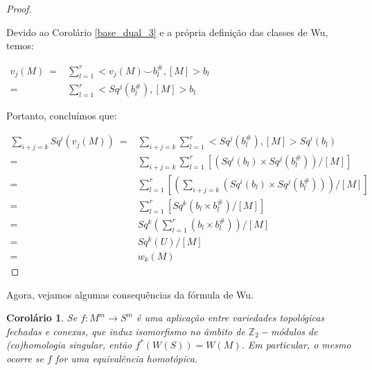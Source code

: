\documentclass[12pt,oneside]{book} %
\newtheorem{cor}    {\hspace{0.5cm}Corol\'ario}[chapter]
\newcommand{\ds}{\displaystyle}
\newcommand{\Z}{\mathbb{Z}}
\newcommand{\ccup}{\smile}
\begin{document}
\begin{proof}
	
	\
	
	\par Devido ao Corolário \ref{base_dual_3} e a própria definição das classes de Wu, temos: \newline 
	
	$ \begin{array}{rl}
		v_{j}(M) \ = & \ds\sum_{l=1}^{r}<v_{j}(M)\ccup b_{l}^{\#},[M]>b_{l} \\
		= & \ds\sum_{l=1}^{r}<Sq^{j}(b_{l}^{\#}),[M]>b_{l}
	\end{array} $ \newline
	
	\par Portanto, concluímos que: \newline
	
	$ \begin{array}{rl}
		\ds\sum_{i+j=k}Sq^{i}(v_{j}(M)) \ = & \ds\sum_{i+j=k}\ds\sum_{l=1}^{r}<Sq^{j}(b_{l}^{\#}),[M]>Sq^{i}(b_{l}) \\
		= & \ds\sum_{i+j=k}\ds\sum_{l=1}^{r} \left[ \left( Sq^{i}(b_{l})\times Sq^{j}(b_{l}^{\#}) \right) /[M] \right] \\
		= & \ds\sum_{l=1}^{r} \left[ \left( \ds\sum_{i+j=k} \left( Sq^{i}(b_{l})\times Sq^{j}(b_{l}^{\#}) \right) \right) / [M] \right] \\
		= & \ds\sum_{l=1}^{r} \left[ Sq^{k}(b_{l}\times b_{l}^{\#}) / [M] \right] \\
		= & Sq^{k}\left( \ds\sum_{l=1}^{r}(b_{l}\times b_{l}^{\#}) \right) / [M] \\
		= & Sq^{k}(U) / [M] \\
		= & w_{k}(M)
	\end{array} $
	
\end{proof}

\par Agora, vejamos algumas consequências da fórmula de Wu.

\begin{cor}\label{ap_wu_1}
	Se $f:M^{m}\to S^{m}$ é uma aplicação entre variedades topológicas fechadas e conexas, que induz isomorfismo no âmbito de $\Z_{2}-$módulos de (co)homologia singular, então $f^{*}(W(S))=W(M)$. Em particular, o mesmo ocorre se $f$ for uma equivalência homotópica.
\end{cor}
\end{document}
